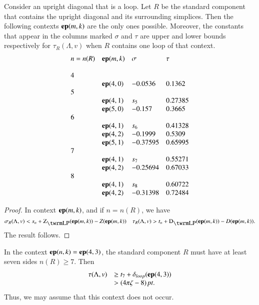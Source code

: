 \begin{lemma}\label{lemma:loop}
Consider an upright diagonal that is a loop.  Let $R$ be the
standard component that contains the upright diagonal and its
surrounding simplices.   Then the following contexts ${\operatorname{\bf ep}}{(m,k)}$ are the
only ones possible.  Moreover, the constants that appear in the
columns marked $\sigma$ and $\tau$ are upper and lower bounds
respectively for $\tau_R(\Lambda,v)$ when $R$ contains one loop of that
context.
    $$
    \begin{array}{llll}
        n=n(R)&{\operatorname{\bf ep}}{(m,k)} &\sigma &\tau \\
        &&&\\
        4& & &\\
        &{\operatorname{\bf ep}}{(4,0)} &-0.0536 & 0.1362 \\
        5 & & &\\
        &{\operatorname{\bf ep}}{(4,1)} &s_5 &0.27385\\
        &{\operatorname{\bf ep}}{(5,0)} &-0.157   &0.3665\\
        6 & & &\\
        &{\operatorname{\bf ep}}{(4,1)} &s_6 &0.41328\\
        &{\operatorname{\bf ep}}{(4,2)} &-0.1999  &0.5309\\
        &{\operatorname{\bf ep}}{(5,1)} &-0.37595 &0.65995\\
        7 & & &\\
        &{\operatorname{\bf ep}}{(4,1)} &s_7 &0.55271\\
        &{\operatorname{\bf ep}}{(4,2)} &-0.25694 &0.67033\\
        8 & & &\\
        &{\operatorname{\bf ep}}{(4,1)} &s_8 &0.60722\\
        &{\operatorname{\bf ep}}{(4,2)} &-0.31398 &0.72484
    \end{array}
    $$
\end{lemma}

\begin{proof} In context ${\operatorname{\bf ep}}{(m,k)}$, and if $n=n(R)$, we have
    $$
    \sigma_R(\Lambda,v) < s_{n} + \ZLP(\y{(m,k)})-Z(\y{(m,k)})\quad
    \tau_R(\Lambda,v)> t_{n}+\DLP(\y{(m,k)})-D(\y{(m,k)}).
    $$
The result follows.
\end{proof}

In the context ${\operatorname{\bf ep}}{(n,k)}={\operatorname{\bf ep}}{(4,3)}$, the standard component $R$ must have at
least seven sides $n(R)\ge7$.   Then
    $$
    \begin{array}{lll}
    \tau(\Lambda,v)&\ge t_7+{\delta}_{loop}({\operatorname{\bf ep}}{(4,3)})\\
            &>(4\pi\zeta-8)\,\hbox{\it pt}.
    \end{array}
    $$
Thus, we may assume that this context does not occur.

